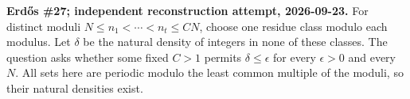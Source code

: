 \textbf{Erd\H{o}s \#27; independent reconstruction attempt, 2026-09-23.}
For distinct moduli $N\leq n_1<\cdots<n_t\leq CN$, choose one residue
class modulo each modulus. Let $\delta$ be the natural density of integers
in none of these classes. The question asks whether some fixed $C>1$
permits $\delta\leq\epsilon$ for every $\epsilon>0$ and every $N$.
All sets here are periodic modulo the least common multiple of the
moduli, so their natural densities exist.
